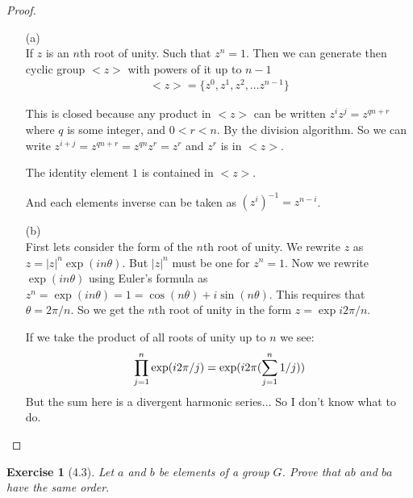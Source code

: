\documentclass[12pt,leqno]{article}
\numberwithin{equation}{section}
\newtheorem*{exer}{Exercise}
\theoremstyle{definition}
\begin{document}
\begin{proof}[Proof]
\begin{enumerate}
\item[(a)] \hfill \\

    If $z$ is an $n$th root of unity. Such that $z^n = 1$. Then we can generate
    then cyclic group $<z>$ with powers of it up to $n - 1$
    \begin{align*}
        <z> = \{z^0, z^1, z^2, \dots z^{n-1} \}
    \end{align*}

    This is closed because any product in $<z>$ can be written $z^i z^j = z^{qn + r}$
    where $q$ is some integer, and $0 < r < n$. By the division algorithm. So we can write
    $z^{i + j} = z^{qn + r} = z^{qn} z^r = z^r$ and $z^r$ is in $<z>$.

    The identity element $1$ is contained in $<z>$. 

    And each elements inverse can be taken as $(z^i)^{-1} = z^{n-i}$.

\item[(b)] \hfill \\

    First lets consider the form of the $n$th root of unity. We rewrite $z$ as
    $z = |z|^n \exp(in\theta)$.  But $|z|^n$ must be one for $z^n = 1$. Now we
    rewrite $\exp(i n \theta)$ using Euler's formula as $z^n = \exp(i n \theta)
    = 1 = \cos (n\theta) + i \sin (n\theta)$. This requires that $\theta = 2
    \pi / n$. So we get the $n$th root of unity in the form $z = \exp{i 2 \pi /
    n}$.

    If we take the product of all roots of unity up to $n$ we see:
    $$
        \prod_{j = 1}^{n} \exp(i 2 \pi /j) = \exp(i2\pi(\sum_{j = 1}^{n} 1/j))    \\
    $$
    But the sum here is a divergent harmonic series... So I don't know what to do.
\end{enumerate}

\end{proof}

\begin{exer}[4.3]Let $a$ and $b$ be elements of a group $G$. Prove that $ab $ and $ba$ have the same order.

\end{exer}
\end{document}
